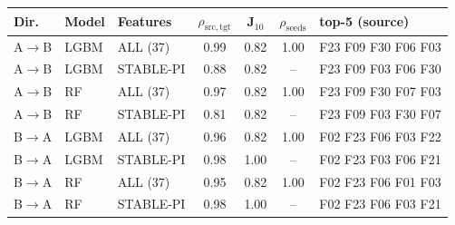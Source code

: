 \begin{tabular}{lllcccp{3.2cm}}
\toprule
Dir. & Model & Features & $\rho_{\mathrm{src,tgt}}$ & J$_{10}$ & $\rho_{\mathrm{seeds}}$ & top-5 (source) \\
\midrule
A$\rightarrow$B & LGBM & ALL (37) & 0.99 & 0.82 & 1.00 & \scriptsize F23 F09 F30 F06 F03 \\
A$\rightarrow$B & LGBM & STABLE-PI & 0.88 & 0.82 & -- & \scriptsize F23 F09 F03 F06 F30 \\
A$\rightarrow$B & RF & ALL (37) & 0.97 & 0.82 & 1.00 & \scriptsize F23 F09 F30 F07 F03 \\
A$\rightarrow$B & RF & STABLE-PI & 0.81 & 0.82 & -- & \scriptsize F23 F09 F03 F30 F07 \\
B$\rightarrow$A & LGBM & ALL (37) & 0.96 & 0.82 & 1.00 & \scriptsize F02 F23 F06 F03 F22 \\
B$\rightarrow$A & LGBM & STABLE-PI & 0.98 & 1.00 & -- & \scriptsize F02 F23 F03 F06 F21 \\
B$\rightarrow$A & RF & ALL (37) & 0.95 & 0.82 & 1.00 & \scriptsize F02 F23 F06 F01 F03 \\
B$\rightarrow$A & RF & STABLE-PI & 0.98 & 1.00 & -- & \scriptsize F02 F23 F06 F03 F21 \\
\bottomrule
\end{tabular}
